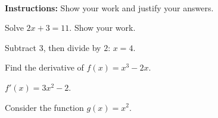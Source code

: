 \documentclass{ximera}
\begin{document}
\begin{examcover}
  \examcoverheading{\examtitletext}
  \noindent\examcoursetext\quad\examversiontext\quad\examdatetext\par
  \noindent\examnameprompt\ \examnamefield\par\bigskip
  \noindent\textbf{Instructions:} Show your work and justify your answers.
  \par\bigskip
  \gradetable[h][][4]
\end{examcover}

\begin{questions}

\question[5] Solve \(2x+3=11\). Show your work.
\begin{solution}[1.5in]
  Subtract \(3\), then divide by \(2\): \(x=4\).
\end{solution}

\question[5] Find the derivative of \(f(x)=x^3-2x\).
\begin{solution}[\stretch{1}]
  \(f'(x)=3x^2-2\).
\end{solution}

\question Consider the function \(g(x)=x^2\).

\end{questions}
\end{document}
